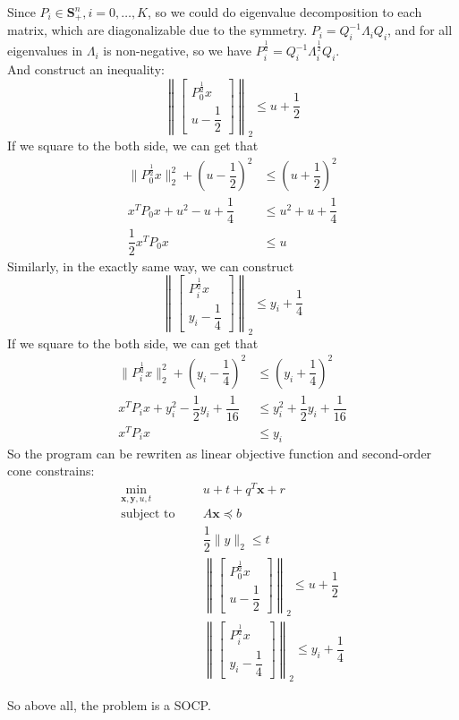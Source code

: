 Since $P_i \in \mathbf{S}_{+}^n, i=0, \ldots, K$, so we could do eigenvalue decomposition to each matrix, which are diagonalizable due to the symmetry.
$P_i=Q_i^{-1}\Lambda_iQ_i$, and for all eigenvalues in $\Lambda_i$ is non-negative, so we have $P_i^{\frac{1}{2}}=Q_i^{-1}\Lambda_i^{\frac{1}{2}}Q_i$.\\
And construct an inequality:
$$\left\|
\left[\begin{array}{l}
P_0^{\frac{1}{2}}x \\
u-\dfrac{1}{2}
\end{array}\right]\right\|_2
\leq
u+\dfrac{1}{2}
$$
If we square to the both side, we can get that
\begin{align*}
    \|P_0^{\frac{1}{2}}x\|_2^2+(u-\dfrac{1}{2})^2 &\leq (u+\dfrac{1}{2})^2\\
    x^TP_0x+u^2-u+\dfrac{1}{4} &\leq u^2+u+\dfrac{1}{4} \\
    \dfrac{1}{2}x^TP_0x &\leq u
\end{align*}
Similarly, in the exactly same way, we can construct
$$\left\|
\left[\begin{array}{l}
P_i^{\frac{1}{2}}x \\
y_i-\dfrac{1}{4}
\end{array}\right]\right\|_2
\leq
y_i+\dfrac{1}{4}
$$
If we square to the both side, we can get that
\begin{align*}
    \|P_i^{\frac{1}{2}}x\|_2^2+(y_i-\dfrac{1}{4})^2 &\leq (y_i+\dfrac{1}{4})^2\\
    x^TP_ix+y_i^2-\dfrac{1}{2}y_i+\dfrac{1}{16} &\leq y_i^2+\dfrac{1}{2}y_i+\dfrac{1}{16} \\
    x^TP_ix &\leq y_i
\end{align*}
So the program can be rewriten as linear objective function and second-order cone constrains:
\begin{align*}
    \min_{\mathbf{x},\mathbf{y},u,t}\ \ \ \ \ & u+t+q^T \mathbf{x}+r \\
    \text {subject to }\ \ \ \ \ & A \mathbf{x} \preceq b \\
    & \dfrac{1}{2}\|y\|_2 \leq t \\
    & \left\|
    \left[\begin{array}{l}
    P_0^{\frac{1}{2}}x \\
    u-\dfrac{1}{2}
    \end{array}\right]\right\|_2
    \leq
    u+\dfrac{1}{2} \\
    & \left\|
    \left[\begin{array}{l}
    P_i^{\frac{1}{2}}x \\
    y_i-\dfrac{1}{4}
    \end{array}\right]\right\|_2
    \leq
    y_i+\dfrac{1}{4}
\end{align*}

So above all, the problem is a SOCP.\\

\newpage